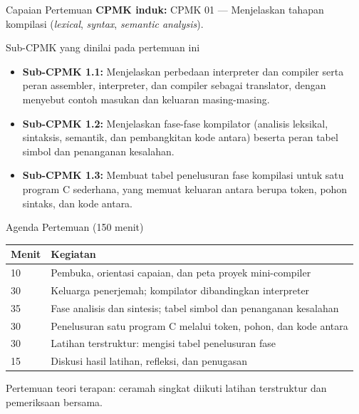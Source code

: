 \documentclass[aspectratio=169,10pt,t]{beamer}
\begin{document}

\begin{frame}{Capaian Pertemuan}
  \textbf{CPMK induk:} CPMK 01 --- Menjelaskan tahapan kompilasi
  (\textit{lexical}, \textit{syntax}, \textit{semantic analysis}).

  \vspace{3pt}
  \begin{block}{Sub-CPMK yang dinilai pada pertemuan ini}
    \footnotesize
    \begin{itemize}
      \setlength{\itemsep}{1pt}
      \item \textbf{Sub-CPMK 1.1:} Menjelaskan perbedaan interpreter dan
            compiler serta peran assembler, interpreter, dan compiler
            sebagai translator, dengan menyebut contoh masukan dan
            keluaran masing-masing.
      \item \textbf{Sub-CPMK 1.2:} Menjelaskan fase-fase kompilator
            (analisis leksikal, sintaksis, semantik, dan pembangkitan
            kode antara) beserta peran tabel simbol dan penanganan
            kesalahan.
      \item \textbf{Sub-CPMK 1.3:} Membuat tabel penelusuran fase
            kompilasi untuk satu program C sederhana, yang memuat
            keluaran antara berupa token, pohon sintaks, dan kode antara.
    \end{itemize}
  \end{block}
\end{frame}

\begin{frame}{Agenda Pertemuan (150 menit)}
  \small
  \begin{tabular}{@{}p{1.4cm}p{12.3cm}@{}}
    \toprule
    \textbf{Menit} & \textbf{Kegiatan} \\
    \midrule
    10 & Pembuka, orientasi capaian, dan peta proyek mini-compiler \\
    30 & Keluarga penerjemah; kompilator dibandingkan interpreter \\
    35 & Fase analisis dan sintesis; tabel simbol dan penanganan kesalahan \\
    30 & Penelusuran satu program C melalui token, pohon, dan kode antara \\
    30 & Latihan terstruktur: mengisi tabel penelusuran fase \\
    15 & Diskusi hasil latihan, refleksi, dan penugasan \\
    \bottomrule
  \end{tabular}

  \vspace{6pt}
  {\scriptsize\color{ubbblue!75}Pertemuan teori terapan: ceramah singkat
  diikuti latihan terstruktur dan pemeriksaan bersama.}
\end{frame}
\end{document}
